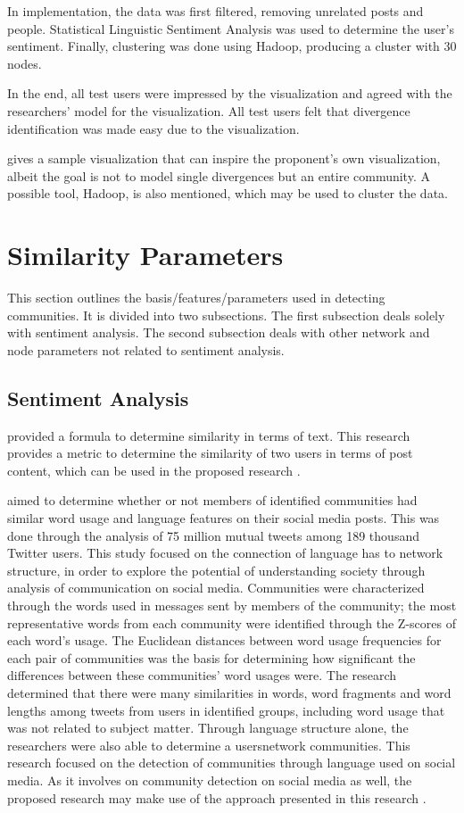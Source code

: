 In implementation, the data was first filtered, removing unrelated posts and people. Statistical Linguistic Sentiment Analysis was used to determine the user’s sentiment. Finally, clustering was done using Hadoop, producing a cluster with 30 nodes. 

In the end, all test users were impressed by the visualization and agreed with the researchers’ model for the visualization. All test users felt that divergence identification was made easy due to the visualization. 

 gives a sample visualization that can inspire the proponent’s own visualization, albeit the goal is not to model single divergences but an entire community. A possible tool, Hadoop, is also mentioned, which may be used to cluster the data.

\section{Similarity Parameters}
This section outlines the basis/features/parameters used in detecting communities. It is divided into two subsections. The first subsection deals solely with sentiment analysis. The second subsection deals with other network and node parameters not related to sentiment analysis. 

\subsection{Sentiment Analysis}

 provided a formula to determine similarity in terms of text. This research provides a metric to determine the similarity of two users in terms of post content, which can be used in the proposed research \cite{Zhang:2012}.

 aimed to determine whether or not members of identified communities had similar word usage and language features on their social media posts. This was done through the analysis of 75 million mutual tweets among 189 thousand Twitter users. This study focused on the connection of language has to network structure, in order to explore the potential of understanding society through analysis of communication on social media. Communities were characterized through the words used in messages sent by members of the community; the most representative words from each community were identified through the Z-scores of each word’s usage. The Euclidean distances between word usage frequencies for each pair of communities was the basis for determining how significant the differences between these communities’ word usages were. The research determined that there were many similarities in words, word fragments and word lengths among tweets from users in identified groups, including word usage that was not related to subject matter. Through language structure alone, the researchers were also able to determine a users\vtick network communities. This research focused on the detection of communities through language used on social media. As it involves on community detection on social media as well, the proposed research may make use of the approach presented in this research \cite{Bryden:2013}.


